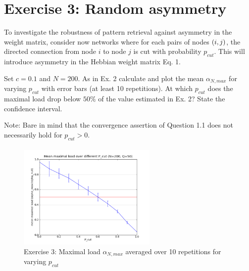 \section{Exercise 3: Random asymmetry}

\begin{itshape}
\small
To investigate the robustness of pattern retrieval against asymmetry in the weight matrix, consider now networks where for each pairs of nodes $\left(i, j\right)$, the directed connection from node $i$ to node $j$ is cut with probability $p_{cut}$. This will introduce asymmetry in the Hebbian weight matrix Eq. 1.

Set $c=0.1$ and $N = 200$. As in Ex. 2 calculate and plot the mean $\alpha_{N,max}$ for varying $p_{cut}$ with error bars (at least 10 repetitions). At which $p_{cut}$ does the maximal load drop below $50\%$ of the value estimated in Ex. 2? State the confidence interval.

Note: Bare in mind that the convergence assertion of Question 1.1 does not necessarily hold for $p_{cut} > 0$.
\end{itshape}

\paragraph*{}



\begin{figure}[H]
  \vspace{-20pt}
  \begin{center}
    \includegraphics[width=0.6\textwidth]{dat/ex3-mean_max_load-N200-Q50-C95}
  \end{center}
  \vspace{-20pt}
  \caption{Exercise 3: Maximal load $\alpha_{N,max}$ averaged over 10 repetitions for varying $p_{cut}$ }
  \label{fig:exercise3}
  \vspace{-10pt}
\end{figure}

